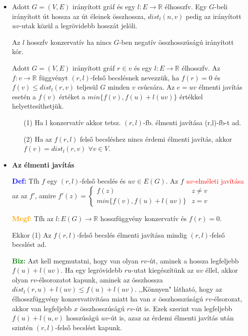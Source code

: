 \documentclass[../../szobeli.tex]{subfiles}
\begin{document}
\begin{itemize}
        \item Adott $G=(V,E)$ irányított gráf és egy $l:E \rightarrow \mathbb{R}$ élhosszfv. 
        Egy $G$-beli irányított út hossza az út éleinek összhossza, $dist_l(n,v)$ pedig az irányított $uv$-utak közül a legrövidebb hosszát jelöli. 

        Az $l$ hosszfv konzervatív ha nincs $G$-ben negatív összhosszúságú irányított kör. 
        
        Adott $G=(V,E)$ irányított gráf $r\in v$ és egy $l:E\rightarrow \mathbb{R}$ élhosszfv. Az $f:v \rightarrow \mathbb{R}$ függvényt $(r,l)$-felső becslésnek nevezzük, ha $f(r)=0$ és $f(v) \leq dist_l(r,v)$ teljesül $G$ minden $v$ csúcsára. Az $e=uv$ élmenti javítás esetén a $f(v)$ értéket a $min\{f(v),f(u)+l(uv)\}$ értékkel helyettesíthetjük. \begin{itemize}
            \item[(1)] Ha l konzervatív akkor tetsz. $(r,l)$-fb. élmenti javítása (r,l)-fb-t ad.
            \item[(2)] Ha az $f(r,l)$ felső becsléshez nincs érdemi élmenti javítás, akkor $f(v)=dist_l(r,v)$ $\forall v \in V$.
        \end{itemize}
        \item \textbf{Az élmenti javítás}

        \textbf{\textcolor{blue}{Def:}} Tfh $f$ egy $(r,l)$-felső becslés és $uv \in E(G)$. Az $f$ \textcolor{red}{$uv$-elméleti javítása} az az $f'$, amire 
        $
            f'(z) = \begin{cases}
                f(z) & z \neq v \\
                min\{f(v), f(u) + l(uv)\} & z = v
            \end{cases}
        $

        \textbf{\textcolor{orange}{Megf:}} Tfh az $l:E(G)\rightarrow \mathbb{R}$ hosszfüggvény konzervatív és $f(r) = 0$. 
        
        Ekkor (1) Az $f (r,l)$-felső becslés élmenti javítása mindig $(r,l)$-felső becslést ad.

        \textbf{\textcolor{green}{Biz:}} Azt kell megmutatni, hogy van  olyan $rv$-út, aminek a hossza legfeljebb $f(u) + l(uv)$. Ha egy legrövidebb $ru$-utat kiegészítünk az $uv$ éllel, akkor olyan $rv$-élsorozatot kapunk, aminek az összhossza $dist_l (r,u) + l(uv) \leq f(u) + l(uv)$. ,,Könnyen" látható, hogy  az élhosszfüggvény konzervativitása miatt ha van $x$ összhosszúságú $rv$-élsorozat, akkor van legfeljebb $x$ összhosszúságú $rv$-út is. Ezek szerint van legfeljebb $f(u) + l(u,v)$ hosszúságú $uv$-út is, azaz az érdemi élmenti javítás után szintén $(r,l)$-felső becslést kapunk.    


\end{itemize}
\end{document}
